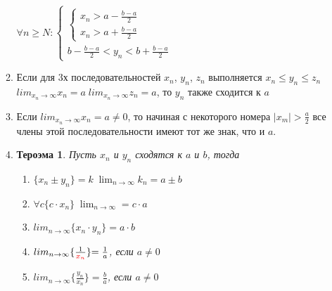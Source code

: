 \documentclass[oneside]{book}
\newtheorem{thm}{Тероэма}[chapter] %
\begin{document}
\begin{enumerate}
\begin{enumerate}
\begin{center}
            $\forall n \geq N: \begin{cases}
                \begin{cases}
                    x_n > a - \frac{b-a}{2} \\
                    x_n > a + \frac{b-a}{2}
                \end{cases} \\
                b - \frac{b-a}{2} < y_n < b + \frac{b-a}{2}
            \end{cases}$
          \end{center}
    \item Если для 3х последовательностей ${x_n}$, ${y_n}$, ${z_n}$ выполняется $x_n \leq y_n \leq z_n$
          $lim_{x_n \rightarrow \infty}{x_n = a}\; lim_{x_n \rightarrow \infty}{z_n = a}$, то ${y_n}$ также сходится к $a$
    \item Если $lim_{x_n \rightarrow \infty}{x_n = a \neq 0}$, то начиная с некоторого номера $|x_m| >
          \frac{a}{2}$ все члены этой последовательности имеют тот же знак, что и $a$.
    \item \begin{thm}
        Пусть ${x_n}$ и ${y_n}$ сходятся к $a$ и $b$, тогда \begin{enumerate}
            \item $\{x_n \pm y_n\} = k\; \lim_{n \rightarrow \infty}{k_n = a \pm b}$
            \item $\forall c \{c \cdot x_n\}\; \lim_{n \rightarrow \infty}{= c \cdot a}$
            \item $lim_{n \rightarrow \infty}{\{x_n \cdot y_n\} = a \cdot b}$
            \item $lim_{n \rightarrow \infty}\{{\frac{1}{\textcolor{red}{x_n}}\}{= \frac{1}{a}}}$, если $a \neq 0$
            \item $lim_{n \rightarrow \infty}{\{{\frac{y_n}{x_n}}\}= \frac{b}{a}}$, если $a \neq 0$
        \end{enumerate}
    \end{thm}
\end{enumerate}


\end{enumerate}
\end{document}
